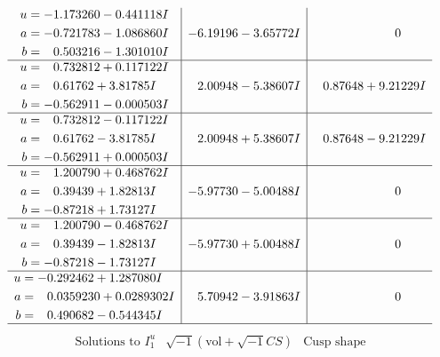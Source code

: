 \documentclass[1p]{elsarticle_modified}
\theoremstyle{definition}
\newcommand{\I}{\sqrt{-1}}
\begin{document}
$$\begin{array}{c|c|c}
\begin{aligned}
u &= -1.173260 - 0.441118 I \\
a &= -0.721783 - 1.086860 I \\
b &= \phantom{-}0.503216 - 1.301010 I\end{aligned}
 & -6.19196 - 3.65772 I & \phantom{-0.000000 } 0 \\ \hline\begin{aligned}
u &= \phantom{-}0.732812 + 0.117122 I \\
a &= \phantom{-}0.61762 + 3.81785 I \\
b &= -0.562911 - 0.000503 I\end{aligned}
 & \phantom{-}2.00948 - 5.38607 I & \phantom{-}0.87648 + 9.21229 I \\ \hline\begin{aligned}
u &= \phantom{-}0.732812 - 0.117122 I \\
a &= \phantom{-}0.61762 - 3.81785 I \\
b &= -0.562911 + 0.000503 I\end{aligned}
 & \phantom{-}2.00948 + 5.38607 I & \phantom{-}0.87648 - 9.21229 I \\ \hline\begin{aligned}
u &= \phantom{-}1.200790 + 0.468762 I \\
a &= \phantom{-}0.39439 + 1.82813 I \\
b &= -0.87218 + 1.73127 I\end{aligned}
 & -5.97730 - 5.00488 I & \phantom{-0.000000 } 0 \\ \hline\begin{aligned}
u &= \phantom{-}1.200790 - 0.468762 I \\
a &= \phantom{-}0.39439 - 1.82813 I \\
b &= -0.87218 - 1.73127 I\end{aligned}
 & -5.97730 + 5.00488 I & \phantom{-0.000000 } 0 \\ \hline\begin{aligned}
u &= -0.292462 + 1.287080 I \\
a &= \phantom{-}0.0359230 + 0.0289302 I \\
b &= \phantom{-}0.490682 - 0.544345 I\end{aligned}
 & \phantom{-}5.70942 - 3.91863 I & \phantom{-0.000000 } 0\\
 \hline 
 \end{array}$$\newpage$$\begin{array}{c|c|c}  
\text{Solutions to }I^u_{1}& \I (\text{vol} + \sqrt{-1}CS) & \text{Cusp shape}\\

\end{array}$$
\end{document}
